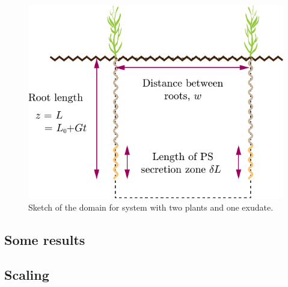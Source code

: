 \documentclass[11pt]{article}
\begin{document}
\begin{figure}[h]
    \centering
    \includegraphics[scale=0.7]{Figures/Second-plot.pdf}
    \caption{Sketch of the domain for system with two plants and one exudate.}
    \label{fig:2roots-a}
\end{figure}

\subsection{Some results}


\newpage
\subsection{Scaling}
\label{2-Base-Scaling}
\end{document}
